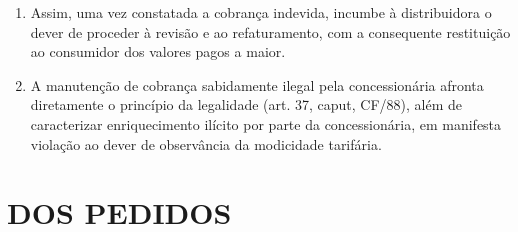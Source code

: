 \begin{enumerate}[resume]
{    (...)

    II - faturamento a maior: devolver ao consumidor e demais usuários, até o segundo ciclo de faturamento posterior à constatação, as quantias recebidas indevidamente nos últimos 60 ciclos de faturamento imediatamente anteriores à constatação. (Suspensos os efeitos referentes ao prazo de 60 (sessenta) ciclos, conforme DSP ANEEL 2.006, de 08.07.2024)
}
\item Assim, uma vez constatada a cobrança indevida, incumbe à distribuidora o dever de proceder à revisão e ao refaturamento, com a consequente restituição ao consumidor dos valores pagos a maior.
\item A manutenção de cobrança sabidamente ilegal pela concessionária afronta diretamente o princípio da legalidade (art. 37, caput, CF/88), além de caracterizar enriquecimento ilícito por parte da concessionária, em manifesta violação ao dever de observância da modicidade tarifária.
\end{enumerate}

\section{DOS PEDIDOS}


